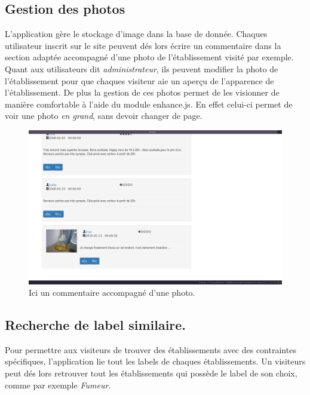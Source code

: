 \documentclass[a4paper,10pt]{article}
\begin{document}
\subsection{Gestion des photos}
    L'application gère le stockage d'image dans la base de donnée.
    Chaques utilisateur inscrit sur le site peuvent dés lors écrire un
    commentaire dans la section adaptée accompagné d'une photo de
    l'établissement visité par exemple. \newline
    Quant aux utilisateurs dit \emph{administrateur}, ils peuvent modifier
    la photo de l'établissement pour que chaques visiteur aie un aperçu de
    l'apparence de l'établissement. \newline
    De plus la gestion de ces photos permet de les visionner de manière
    comfortable à l'aide du module enhance.js. En effet celui-ci permet de voir
    une photo \emph{en grand}, sans devoir changer de page.

    \begin{figure}[h]
        \centering
        \includegraphics[scale=0.3]{./images/picture.png}
        \caption{Ici un commentaire accompagné d'une photo.}
    \end{figure}

\subsection{Recherche de label similaire.}
    Pour permettre aux visiteurs de trouver des établissements avec des
    contraintes spécifiques, l'application lie tout les labels de chaques
    établissements. Un visiteurs peut dés lors retrouver tout les
    établissements qui possède le label de son choix, comme par exemple
    \emph{Fumeur}.
\end{document}
